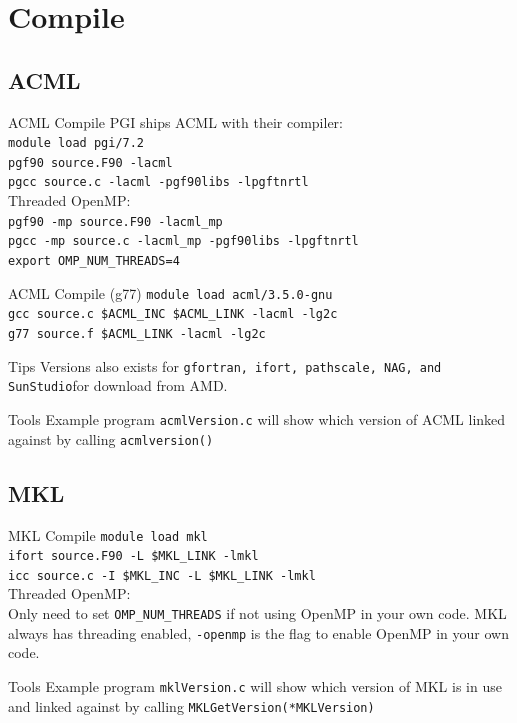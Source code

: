 \documentclass[handout]{beamer}
\begin{document}
\section{Compile}
\subsection{ACML}
\begin{frame}{ACML Compile}
PGI ships ACML with their compiler: \\
\texttt{module load pgi/7.2}        \\
\texttt{pgf90 source.F90 -lacml}    \\
\texttt{pgcc  source.c -lacml -pgf90libs -lpgftnrtl} \\
Threaded OpenMP:                    \\
\texttt{pgf90 -mp source.F90 -lacml\_mp}            \\
\texttt{pgcc  -mp source.c   -lacml\_mp -pgf90libs -lpgftnrtl} \\
\texttt{export OMP\_NUM\_THREADS=4}                 \\
\end{frame}
\begin{frame}{ACML Compile (g77)}
\texttt{module load acml/3.5.0-gnu}       \\
\texttt{gcc source.c \$ACML\_INC \$ACML\_LINK -lacml -lg2c} \\
\texttt{g77 source.f \$ACML\_LINK -lacml -lg2c}  \\
\begin{block}{Tips}
Versions also exists for \texttt{gfortran, ifort, pathscale, NAG, and SunStudio}for download from AMD. 
\end{block}
\begin{block}{Tools}
Example program \texttt{acmlVersion.c} will show which version of ACML linked against by calling \texttt{acmlversion()}
\end{block}
\end{frame}

\subsection{MKL}
\begin{frame}{MKL Compile}
\texttt{module load mkl}            \\
\texttt{ifort source.F90 -L \$MKL\_LINK -lmkl}      \\
\texttt{icc   source.c   -I \$MKL\_INC -L \$MKL\_LINK -lmkl}  \\
Threaded OpenMP:                    \\
Only need to set \texttt{OMP\_NUM\_THREADS} if not using OpenMP in your own code.  MKL always has threading enabled, \texttt{-openmp} is the flag to enable OpenMP in your own code.
\begin{block}{Tools}
Example program \texttt{mklVersion.c} will show which version of MKL is in use and linked against by calling \texttt{MKLGetVersion(*MKLVersion)} \\
\end{block}
\end{frame}
\end{document}
